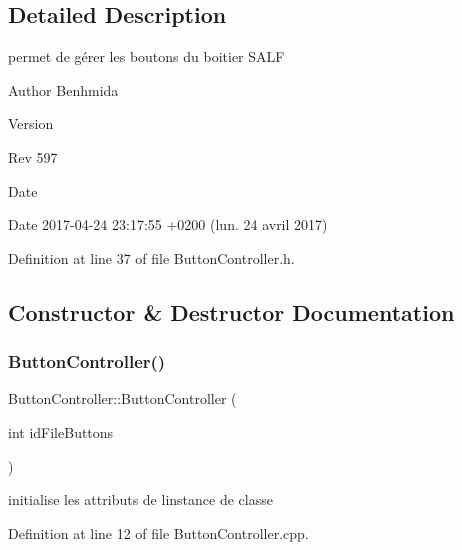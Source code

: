 \subsection{Detailed Description}
permet de gérer les boutons du boitier S\+A\+LF 

\begin{DoxyAuthor}{Author}
Benhmida 
\end{DoxyAuthor}
\begin{DoxyVersion}{Version}

\end{DoxyVersion}
\begin{DoxyParagraph}{Rev}
597 
\end{DoxyParagraph}
\begin{DoxyDate}{Date}

\end{DoxyDate}
\begin{DoxyParagraph}{Date}
2017-\/04-\/24 23\+:17\+:55 +0200 (lun. 24 avril 2017) 
\end{DoxyParagraph}


Definition at line 37 of file Button\+Controller.\+h.



\subsection{Constructor \& Destructor Documentation}
\mbox{\label{class_button_controller_a59f3c5f3163bc05c9a7621455d6ed409}} 
\subsubsection{\texorpdfstring{Button\+Controller()}{ButtonController()}}
{\footnotesize\ttfamily Button\+Controller\+::\+Button\+Controller (\begin{DoxyParamCaption}\item[{int}]{id\+File\+Buttons }\end{DoxyParamCaption})}



initialise les attributs de l\textquotesingle{}instance de classe 



Definition at line 12 of file Button\+Controller.\+cpp.

